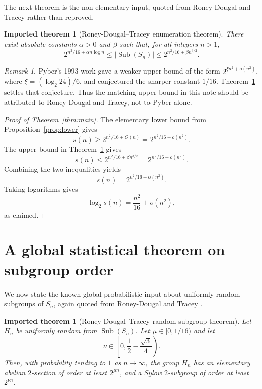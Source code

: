 \documentclass[a4paper,11pt]{amsart}
\newtheorem{importedtheorem}[theorem]{Imported theorem}
\theoremstyle{remark}
\newtheorem{remark}[theorem]{Remark}
\newcommand{\Sub}{\operatorname{Sub}}
\begin{document}
The next theorem is the non-elementary input, quoted from Roney-Dougal and Tracey \cite[Theorem 1]{RDT} rather than reproved.

\begin{importedtheorem}[Roney-Dougal--Tracey enumeration theorem]\label{thm:rdt-enum}
There exist absolute constants \(\alpha>0\) and \(\beta\) such that, for all integers \(n>1\),
\[
        2^{n^2/16+\alpha n\log n}
        \leq
        |\Sub(S_n)|
        \leq
        2^{n^2/16+\beta n^{3/2}}.
\]
\end{importedtheorem}

\begin{remark}
Pyber's 1993 work gave a weaker upper bound of the form \(2^{\xi n^2+o(n^2)}\), where
\(\xi=(\log_2 24)/6\), and conjectured the sharper constant \(1/16\). Theorem~\ref{thm:rdt-enum}
settles that conjecture. Thus the matching upper bound in this note should be attributed to
Roney-Dougal and Tracey, not to Pyber alone.
\end{remark}

\begin{proof}[Proof of Theorem~\ref{thm:main}]
The elementary lower bound from Proposition~\ref{prop:lower} gives
\[
        s(n)\geq 2^{n^2/16+O(n)}=2^{n^2/16+o(n^2)}.
\]
The upper bound in Theorem~\ref{thm:rdt-enum} gives
\[
        s(n)\leq 2^{n^2/16+\beta n^{3/2}}=2^{n^2/16+o(n^2)}.
\]
Combining the two inequalities yields
\[
        s(n)=2^{n^2/16+o(n^2)}.
\]
Taking logarithms gives
\[
        \log_2 s(n)=\frac{n^2}{16}+o(n^2),
\]
as claimed.
\end{proof}

\section{A global statistical theorem on subgroup order}\label{sec:global-order}

We now state the known global probabilistic input about uniformly random subgroups of \(S_n\), again quoted from Roney-Dougal and Tracey \cite[Theorem 6]{RDT}.

\begin{importedtheorem}[Roney-Dougal--Tracey random subgroup theorem]\label{thm:rdt-random}
Let \(H_n\) be uniformly random from \(\Sub(S_n)\). Let \(\mu\in[0,1/16)\) and let
\[
        \nu\in\left[0,\frac12-\frac{\sqrt3}{4}\right).
\]
Then, with probability tending to \(1\) as \(n\to\infty\), the group \(H_n\) has an elementary
abelian \(2\)-section of order at least \(2^{\mu n}\), and a Sylow \(2\)-subgroup of order at least
\(2^{\nu n}\).
\end{importedtheorem}
\end{document}
